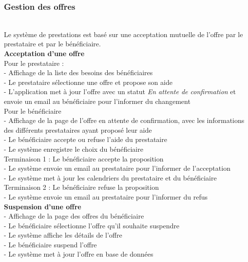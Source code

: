 \documentclass[conference]{IEEEtran}
\begin{document}
\subsubsection{Gestion des offres}\hfil\\

Le système de prestations est basé sur une acceptation mutuelle de l'offre par le prestataire et par le bénéficiaire.\\

\textbf{Acceptation d'une offre}\hfil\\
Pour le prestataire :\\
- Affichage de la liste des besoins des bénéficiaires\\
- Le prestataire sélectionne une offre et propose son aide\\
- L'application met à jour l'offre avec un statut \textit{En attente de confirmation} et envoie un email au bénéficiaire pour l'informer du changement\\

Pour le bénéficiaire\\
- Affichage de la page de l'offre en attente de confirmation, avec les informations des différents prestataires ayant proposé leur aide\\
- Le bénéficiaire accepte ou refuse l'aide du prestataire\\
- Le système enregistre le choix du bénéficiaire\\

Terminaison 1 : Le bénéficiaire accepte la proposition\\
- Le système envoie un email au prestataire pour l'informer de l'acceptation\\
- Le système met à jour les calendriers du prestataire et du bénéficiaire\\

Terminaison 2 : Le bénéficiaire refuse la proposition\\
- Le système envoie un email au prestataire pour l'informer du refus\\

\textbf{Suspension d'une offre}\hfil\\
- Affichage de la page des offres du bénéficiaire\\
- Le bénéficiaire sélectionne l'offre qu'il souhaite suspendre\\
- Le système affiche les détails de l'offre\\
- Le bénéficiaire suspend l'offre\\
- Le système met à jour l'offre en base de données\\
\end{document}
